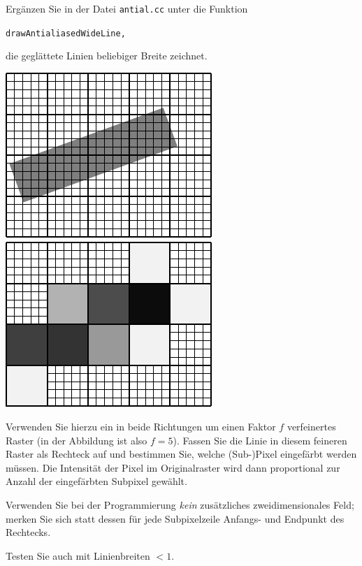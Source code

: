 %
Ergänzen Sie in der Datei \texttt{antial.cc} unter
 die Funktion
\vspace{-\baselineskip}
\vspace{-.5em}
\begin{alltt}
   drawAntialiasedWideLine, 
\end{alltt}
\vspace{-.5em}
die geglättete Linien beliebiger Breite zeichnet.

\begin{center}
  \includegraphics{antial1}    \includegraphics{antial3}
\end{center}

Verwenden Sie hierzu ein in beide Richtungen um einen Faktor $f$
verfeinertes Raster (in der Abbildung ist also $f = 5$). Fassen Sie die 
Linie in diesem feineren Raster als Rechteck auf und bestimmen Sie, 
welche (Sub-)Pixel eingefärbt werden müssen. Die Intensität der Pixel im
Originalraster wird dann proportional zur Anzahl der eingefärbten 
Subpixel gewählt.

Verwenden Sie bei der Programmierung \emph{kein} zusätzliches
zweidimensionales Feld; merken Sie sich statt dessen für jede
Subpixelzeile Anfangs- und Endpunkt des Rechtecks.

Testen Sie auch mit Linienbreiten $< 1$.

